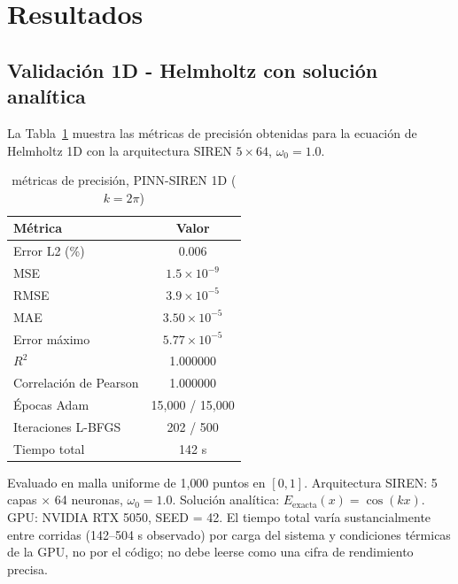 
\section{Resultados}
\label{sec:resultados}

\subsection{Validación 1D - Helmholtz con solución analítica}
\label{subsec:resultados1d}

La Tabla~\ref{tab:resultados1d} muestra las métricas de precisión obtenidas para la
ecuación de Helmholtz 1D con la arquitectura SIREN $5\times64$, $\omega_0 = 1.0$.

\begin{table}[t]
\centering
\renewcommand{\arraystretch}{1.2}
\caption{métricas de precisión, PINN-SIREN 1D ($k = 2\pi$)}
\label{tab:resultados1d}
\begin{tabular}{lc}
\hline
Métrica & Valor \\
\hline
Error L2 (\%)          & 0.006 \\
MSE                    & $1.5 \times 10^{-9}$ \\
RMSE                   & $3.9 \times 10^{-5}$ \\
MAE                    & $3.50 \times 10^{-5}$ \\
Error máximo           & $5.77 \times 10^{-5}$ \\
$R^2$                  & 1.000000 \\
Correlación de Pearson & 1.000000 \\
\hline
Épocas Adam            & 15{,}000 / 15{,}000 \\
Iteraciones L-BFGS     & 202 / 500 \\
Tiempo total           & 142 s \\
\hline
\end{tabular}
\end{table}
\noindent\footnotesize Evaluado en malla uniforme de 1{,}000 puntos en $[0,1]$.
Arquitectura SIREN: 5 capas $\times$ 64 neuronas, $\omega_0 = 1.0$.
Solución analítica: $E_{\mathrm{exacta}}(x) = \cos(kx)$.
GPU: NVIDIA RTX 5050, SEED = 42.
El tiempo total varía sustancialmente entre corridas (142--504 s observado) por carga
del sistema y condiciones térmicas de la GPU, no por el código; no debe leerse como una
cifra de rendimiento precisa.
\normalsize

